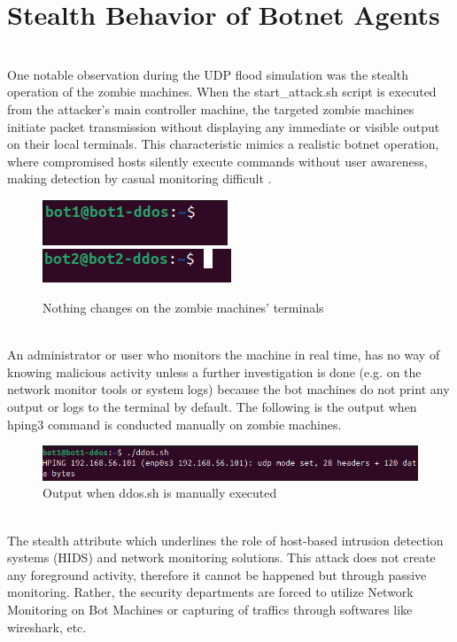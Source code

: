 \section{Stealth Behavior of Botnet Agents}
\\
One notable observation during the UDP flood simulation was the stealth operation of the zombie machines. When the start\_attack.sh script is executed from the attacker’s main controller machine, the targeted zombie machines initiate packet transmission without displaying any immediate or visible output on their local terminals. This characteristic mimics a realistic botnet operation, where compromised hosts silently execute commands without user awareness, making detection by casual monitoring difficult \cite{rodrigues2025kali}.
\begin{figure}[!htb]
    \centering
    \includegraphics[width=0.3\linewidth]{thesis/bot1Stealth.png}
    \includegraphics[width=0.4\linewidth]{thesis/bot2Stealth.png}
    \caption{Nothing changes on the zombie machines' terminals}
    \label{fig:enter-label}
\end{figure}
\\
An administrator or user who monitors the machine in real time, has no way of knowing malicious activity unless a further investigation is done (e.g. on the network monitor tools or system logs) because the bot machines do not print any output or logs to the terminal by default. The following is the output when hping3 command is conducted manually on zombie machines.
\begin{figure}[!htb]
    \centering
    \includegraphics[width=0.8\linewidth]{thesis/ddosNoSsh.png}
    \caption{Output when ddos.sh is manually executed}
    \label{fig:enter-label}
\end{figure}
\\
The stealth attribute which underlines the role of host-based intrusion detection systems (HIDS) and network monitoring solutions. This attack does not create any foreground activity, therefore it cannot be happened but through passive monitoring. Rather, the security departments are forced to utilize Network Monitoring on Bot Machines or capturing of traffics through softwares like wireshark, etc.